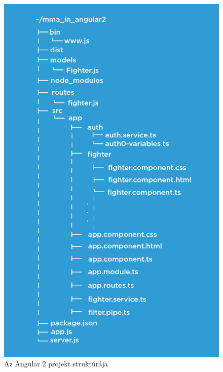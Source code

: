 \begin{figure}[htb]
\centering
\includegraphics[scale=0.7]{kepek/mma_in_angular2.jpeg}
\caption{Az Angular 2 projekt struktúrája}
\label{fig:angularjs_structure}
\end{figure}
